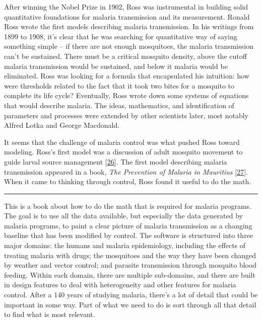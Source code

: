 \documentclass[
]{book}
\begin{document}
After winning the Nobel Prize in 1902, Ross was instrumental in building solid quantitative foundations for malaria transmission and its measurement. Ronald Ross wrote the first models describing malaria transmission. In his writings from 1899 to 1908, it's clear that he was searching for quantitative way of saying something simple -- if there are not enough mosquitoes, the malaria transmission can't be sustained. There must be a critical mosquito density, above the cutoff malaria transmission would be sustained, and below it malaria would be eliminated. Ross was looking for a formula that encapsulated his intuition: how were thresholds related to the fact that it took two bites for a mosquito to complete its life cycle? Eventually, Ross wrote down some systems of equations that would describe malaria. The ideas, mathematics, and identification of parameters and processes were extended by other scientists later, most notably Alfred Lotka and George Macdonald.

It seems that the challenge of malaria control was what pushed Ross toward modeling. Ross's first model was a discussion of adult mosquito movement to guide larval source management {[}\protect\hyperlink{ref-RossR1905LogicalBasis}{26}{]}. The first model describing malaria transmission appeared in a book, \emph{The Prevention of Malaria in Mauritius} {[}\protect\hyperlink{ref-RossR1908}{27}{]}. When it came to thinking through control, Ross found it useful to do the math.

\begin{center}\rule{0.5\linewidth}{0.5pt}\end{center}

This is a book about how to do the math that is required for malaria programs. The goal is to use all the data available, but especially the data generated by malaria programs, to paint a clear picture of malaria transmission as a changing baseline that has been modified by control. The software is structured into three major domains: the humans and malaria epidemiology, including the effects of treating malaria with drugs; the mosquitoes and the way they have been changed by weather and vector control; and parasite transmission through mosquito blood feeding. Within each domain, there are multiple sub-domains, and there are built in design features to deal with heterogeneity and other features for malaria control. After a 140 years of studying malaria, there's a lot of detail that could be important in some way. Part of what we need to do is sort through all that detail to find what is most relevant.
\end{document}

